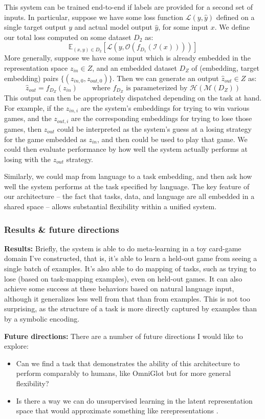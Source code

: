\documentclass[11pt]{article}
\begin{document}
This system can be trained end-to-end if labels are provided for a second set of inputs. In particular, suppose we have some loss function $\mathcal{L}(y, \hat{y})$ defined on a single target output $y$ and actual model output $\hat{y}$, for some input $x$. We define our total loss computed on some dataset $D_2$ as:
$$\mathbb{E}_{(x, y)\in {D}_2} \left[ \mathcal{L}\left(y, \mathcal{O}\left(f_{D_1}\left(\mathcal{I} \left(x\right)\right) \right)\right)\right]$$
More generally, suppose we have some input which is already embedded in the representation space $z_{in} \in Z$, and an embedded dataset $D_Z$ of (embedding, target embedding) pairs $\{(z_{in,0}, z_{out,0})\}$. Then we can generate an output $\hat{z}_{out} \in Z$ as:
$$\hat{z}_{out} = f_{D_Z}(z_{in}) \qquad \text{where } f_{D_Z} \text{ is parameterized by } \mathcal{H}\left(\mathcal{M}\left(D_Z\right)\right)$$
This output can then be appropriately dispatched depending on the task at hand. For example, if the $z_{in,i}$ are the system's embeddings for trying to win various games, and the $z_{out,i}$ are the corresponding embeddings for trying to lose those games, then $z_{out}$ could be interpreted as the system's guess at a losing strategy for the game embedded as $z_{in}$, and then could be used to play that game. We could then evaluate performance by how well the system actually performs at losing with the $z_{out}$ strategy. \par
Similarly, we could map from language to a task embedding, and then ask how well the system performs at the task specified by language. The key feature of our architecture -- the fact that tasks, data, and language are all embedded in a shared space -- allows substantial flexibility within a unified system.



\subsubsection{Results \& future directions}

\textbf{Results:} Briefly, the system is able to do meta-learning in a toy card-game domain I've constructed, that is, it's able to learn a held-out game from seeing a single batch of examples. It's also able to do mapping of tasks, such as trying to lose (based on task-mapping examples), even on held-out games. It can also achieve some success at these behaviors based on natural language input, although it generalizes less well from that than from examples. This is not too surprising, as the structure of a task is more directly captured by examples than by a symbolic encoding. \par 
\textbf{Future directions:}
There are a number of future directions I would like to explore:
\begin{itemize}
\item Can we find a task that demonstrates the ability of this architecture to perform comparably to humans, like OmniGlot \citep{Lake2015} but for more general flexibility?
\item Is there a way we can do unsupervised learning in the latent representation space that would approximate something like rerepresentations \citep{Karmiloff-Smith1986}. 
\end{itemize}
\end{document}
